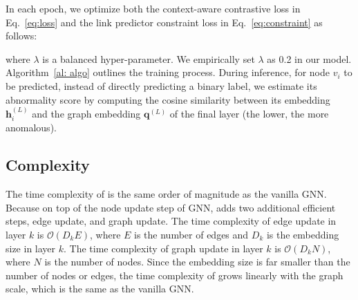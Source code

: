 In each epoch, we optimize both the context-aware contrastive loss in Eq.~\eqref{eq:loss} and the link predictor constraint loss in Eq.~\eqref{eq:constraint} as follows:


\noindent where $\lambda$ is a balanced hyper-parameter. We empirically set $\lambda$ as 0.2 in our model. Algorithm~\ref{al: algo} outlines the training process. 
During inference, for node $v_i$ to be predicted, instead of directly predicting a binary label, we estimate its abnormality score by computing the cosine similarity between its embedding $\boldsymbol{h}_i^{(L)}$ and the graph embedding $\boldsymbol{q}^{(L)}$ of the final layer (the lower, the more anomalous).

\subsection{Complexity}
The time complexity of \smodel is the same order of magnitude as the vanilla GNN.
Because on top of the node update step of GNN, \smodel adds two additional efficient steps, edge update, and graph update. The time complexity of edge update in layer $k$ is $\mathcal{O}\left(D_kE\right)$, where $E$ is the number of edges and $D_k$ is the embedding size in layer $k$. 
The time complexity of graph update in layer $k$ is $\mathcal{O}\left(D_kN\right)$, where $N$ is the number of nodes. Since the embedding size is far smaller than the number of nodes or edges, the time complexity of \smodel grows linearly with the graph scale, which is the same as the vanilla GNN.





























